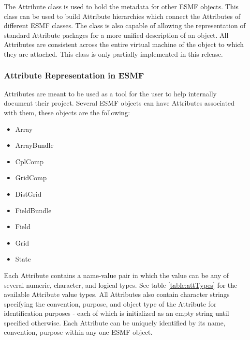 %

The Attribute class is used to hold the metadata for other ESMF objects.  This class can be used to build Attribute hierarchies which connect the Attributes of different ESMF classes.  The class is also capable of allowing the representation of standard Attribute packages for a more unified description of an object.  All Attributes are consistent across the entire virtual machine of the object to which they are attached.  This class is only partially implemented in this release.

\subsubsection{Attribute Representation in ESMF}

Attributes are meant to be used as a tool for the user to help internally document their project.   Several ESMF objects can have Attributes associated with them, these objects are the following:

\begin{itemize}
\item Array
\item ArrayBundle
\item CplComp
\item GridComp
\item DistGrid
\item FieldBundle
\item Field
\item Grid
\item State
\end{itemize}

Each Attribute contains a name-value pair in which the value can be any of several numeric, character, and logical types.  See table \ref{table:attTypes} for the available Attribute value types.  All Attributes also contain character strings specifying the convention, purpose, and object type of the Attribute for identification purposes - each of which is initialized as an empty string until specified otherwise.  Each Attribute can be uniquely identified by its name, convention, purpose within any one ESMF object.  

